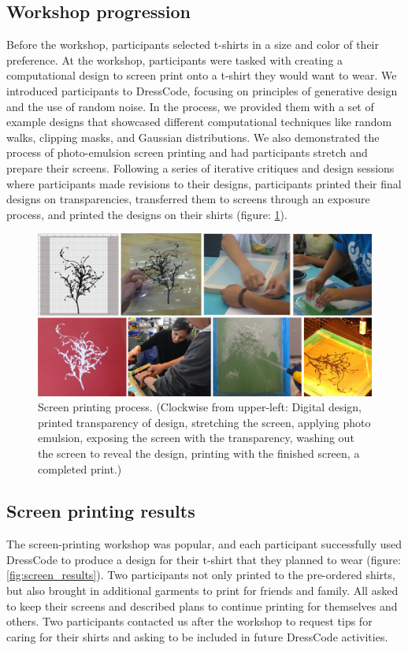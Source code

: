 \documentclass{sigchi}
\begin{document}
\subsection{Workshop progression}
Before the workshop, participants selected t-shirts in a size and color of their preference. At the workshop, participants were tasked with creating a computational design to screen print onto a t-shirt they would want to wear. We introduced participants to DressCode, focusing on principles of generative design and the use of random noise. In the process, we provided them with a set of example designs that showcased different computational techniques like random walks, clipping masks, and Gaussian distributions. We also demonstrated the process of photo-emulsion screen printing and had participants stretch and prepare their screens. Following a series of iterative critiques and design sessions where participants made revisions to their designs, participants printed their final designs on transparencies, transferred them to screens through an exposure process, and printed the designs on their shirts (figure: \ref{fig:screen_printing_process}).
\begin{center}
\begin{figure}[h!]
\includegraphics[width=\columnwidth]{images/screen_printing_process.png}
\caption{Screen printing process. (Clockwise from upper-left: Digital design, printed transparency of design, stretching the screen, applying photo emulsion, exposing the screen with the transparency, washing out the screen to reveal the design, printing with the finished screen, a completed print.) }
\label{fig:screen_printing_process}
\end{figure}
\end{center}
\vspace{-20pt}

\subsection{Screen printing results}
The screen-printing workshop was popular, and each participant successfully used DressCode to produce a design for their t-shirt that they planned to wear (figure: \ref{fig:screen_results}). Two participants not only printed to the pre-ordered shirts, but also brought in additional garments to print for friends and family. All asked to keep their screens and described plans to continue printing for themselves and others. Two participants contacted us after the workshop to request tips for caring for their shirts and asking to be included in future DressCode activities. 
\end{document}
